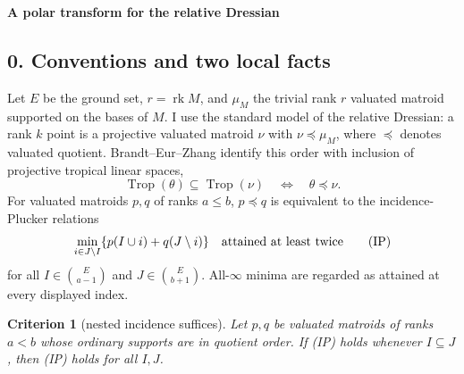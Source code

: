 \documentclass[12pt]{article}
\newcommand{\Trop}{\operatorname{Trop}}
\newcommand{\rk}{\operatorname{rk}}
\newtheorem{criterion}{Criterion}
\begin{document}

\date{}


\begin{center}
{\bf A polar transform for the relative Dressian}
\end{center}

\subsection*{0. Conventions and two local facts}

Let $E$ be the ground set, $r=\rk M$, and $\mu_M$ the trivial rank $r$
valuated matroid supported on the bases of $M$.  I use the standard
model of the relative Dressian: a rank $k$ point is a projective
valuated matroid $\nu$ with $\nu\preceq\mu_M$, where $\preceq$ denotes
valuated quotient.  Brandt--Eur--Zhang \cite{BEZ} identify this order with
inclusion of projective tropical linear spaces,
\[
        \Trop(\theta)\subseteq\Trop(\nu)
        \quad\Longleftrightarrow\quad \theta\preceq\nu .
\]
For valuated matroids $p,q$ of ranks $a\le b$, $p\preceq q$ is
equivalent to the incidence-Plucker relations
\[
 \min_{i\in J\setminus I}\{p(I\cup i)+q(J\setminus i)\}
 \quad\hbox{attained at least twice}                         \tag{IP}
\]
for all $I\in\binom{E}{a-1}$ and $J\in\binom{E}{b+1}$.  All-$\infty$
minima are regarded as attained at every displayed index.

\begin{criterion}[nested incidence suffices]\label{crit:local}
Let $p,q$ be valuated matroids of ranks $a<b$ whose ordinary supports
are in quotient order.  If {\rm (IP)} holds whenever $I\subseteq J$,
then {\rm (IP)} holds for all $I,J$.
\end{criterion}
\end{document}
